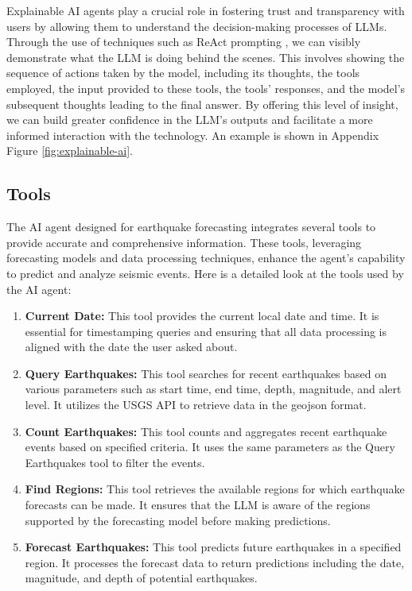 Explainable AI agents play a crucial role in fostering trust and
transparency with users by allowing them to understand the
decision-making processes of \ac{LLM}s. Through the use of
techniques such as ReAct prompting \parencite{yao2023reactsynergizingreasoningacting},
we can visibly demonstrate what the \ac{LLM} is doing behind the scenes. This
involves showing the sequence of actions taken by the model, including
its thoughts, the tools employed, the input provided to these tools,
the tools' responses, and the model's subsequent thoughts leading to
the final answer. By offering this level of insight, we can build
greater confidence in the \ac{LLM}'s outputs and facilitate a more
informed interaction with the technology. An example is shown in Appendix Figure
\ref{fig:explainable-ai}.

\subsection{Tools}

The AI agent designed for earthquake forecasting integrates several tools
to provide accurate and comprehensive information. These tools, leveraging
forecasting models and data processing techniques, enhance the agent's
capability to predict and analyze seismic events. Here is a detailed
look at the tools used by the AI agent:

\begin{enumerate}
  \item \textbf{Current Date:} This tool provides the current
        local date and time. It is essential for timestamping queries
        and ensuring that all data processing is aligned with the
        date the user asked about.
  \item \textbf{Query Earthquakes:} This tool searches for
        recent earthquakes based on various parameters such as start
        time, end time, depth, magnitude, and alert level. It utilizes
        the \ac{USGS} API to retrieve data in the
        geojson format.
  \item \textbf{Count Earthquakes:} This tool counts and aggregates
        recent earthquake events based on specified criteria. It uses the
        same parameters as the Query Earthquakes tool to filter the events.
  \item \textbf{Find Regions:} This tool retrieves the available
        regions for which earthquake forecasts can be made. It ensures
        that the \ac{LLM} is aware of the regions supported by the forecasting
        model before making predictions.
  \item \textbf{Forecast Earthquakes:} This tool predicts future
        earthquakes in a specified region. It processes the forecast data
        to return predictions including the date, magnitude, and depth of
        potential earthquakes.
\end{enumerate}

